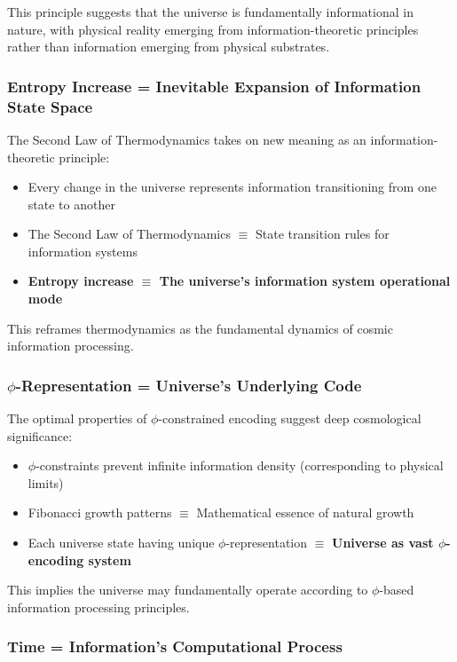 \documentclass[12pt,letterpaper]{article}
\begin{document}
This principle suggests that the universe is fundamentally informational in nature, with physical reality emerging from information-theoretic principles rather than information emerging from physical substrates.

\subsubsection{Entropy Increase = Inevitable Expansion of Information State Space}

The Second Law of Thermodynamics takes on new meaning as an information-theoretic principle:

\begin{itemize}
\item Every change in the universe represents information transitioning from one state to another
\item The Second Law of Thermodynamics $\equiv$ State transition rules for information systems
\item \textbf{Entropy increase $\equiv$ The universe's information system operational mode}
\end{itemize}

This reframes thermodynamics as the fundamental dynamics of cosmic information processing.

\subsubsection{$\phi$-Representation = Universe's Underlying Code}

The optimal properties of $\phi$-constrained encoding suggest deep cosmological significance:

\begin{itemize}
\item $\phi$-constraints prevent infinite information density (corresponding to physical limits)
\item Fibonacci growth patterns $\equiv$ Mathematical essence of natural growth
\item Each universe state having unique $\phi$-representation $\equiv$ \textbf{Universe as vast $\phi$-encoding system}
\end{itemize}

This implies the universe may fundamentally operate according to $\phi$-based information processing principles.

\subsubsection{Time = Information's Computational Process}
\end{document}
